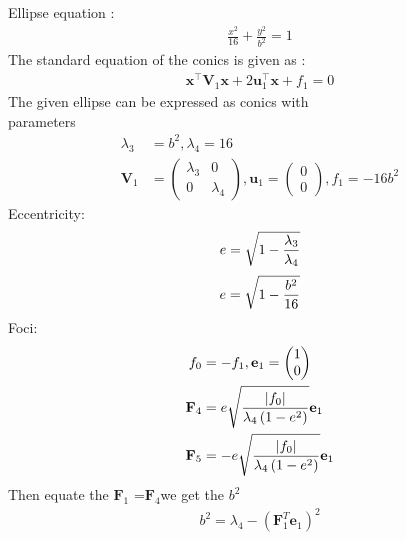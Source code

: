 \documentclass[10pt, a4paper]{article}
\providecommand{\brak}[1]{\ensuremath{\left(#1\right)}}
\newcommand{\myvec}[1]{\ensuremath{\begin{pmatrix}#1\end{pmatrix}}}
\let\vec\mathbf
\begin{document}
Ellipse equation : \begin{align}
\frac{x^2}{16}+\frac{y^2}{b^2}=1
  \end{align}
The standard equation of the conics is given as :
\begin{align}
\vec{x}^{\top}\vec{V}_1\vec{x}+2\vec{u}^{\top}_1\vec{x}+f_1=0
\end{align}
	 The given ellipse can be expressed as conics with \\parameters
\begin{align}
	\lambda_3&=b^2,\lambda_4=16 \\ \vec{V}_1 &= \myvec{	\lambda_3& 0 \\
			          0 & \lambda_4}  
		    , \vec{u}_1 = \myvec{0 \\0}, f_1 = -16b^2
	\end{align}
	Eccentricity:
	\begin{equation}
	 e =\sqrt{1-\frac{\lambda_3}{\lambda_4}}\\
	 \end{equation}
	 \begin{equation}
	 e =\sqrt{1-\frac{b^2}{16}}\\
	 \end{equation}
	 Foci:
	 \begin{align}
	 f_0&=-f_1,\vec{e}_1 = \myvec{1 \\0}\\
	 	 \vec{F}_4&=  e\sqrt{\frac{\abs{f_0}}{\lambda_4\brak{1-e^2}}}\vec{e}_1\\
	 	 \vec{F}_5&= - e\sqrt{\frac{\abs{f_0}}{\lambda_4\brak{1-e^2}}}\vec{e}_1	 	 
	 \end{align}
Then equate the $\vec{F}_1$ =$\vec{F}_4$we get the $b^2$ \\
\begin{align}
	b^2 = \lambda_4 - (\vec{F}_1^T\vec{e}_1)^2
\end{align}
\end{document}

